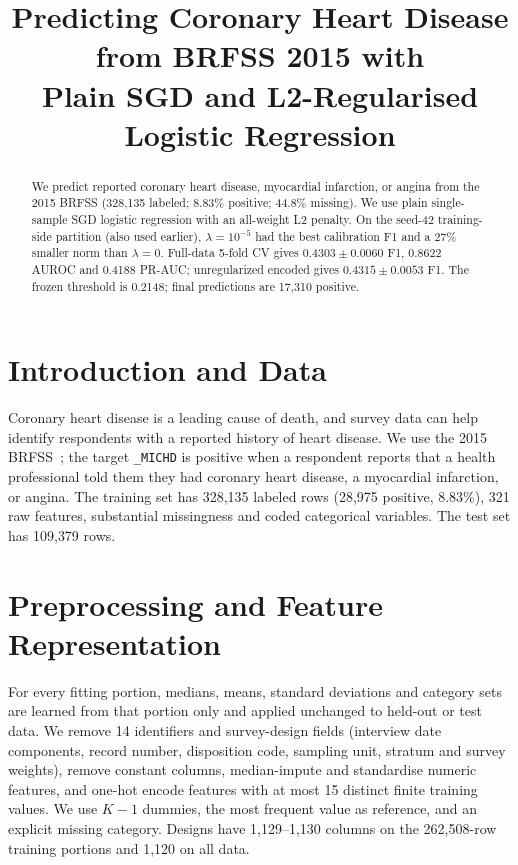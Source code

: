 \documentclass[10pt,conference,compsocconf]{IEEEtran}
\begin{document}
\title{Predicting Coronary Heart Disease from BRFSS 2015 with\\
Plain SGD and L2-Regularised Logistic Regression}

\author{
}

\maketitle

\begin{abstract}
We predict reported coronary heart disease, myocardial infarction, or angina
from the 2015 BRFSS (328{,}135 labeled; 8.83\% positive; 44.8\% missing). We
use plain single-sample SGD logistic regression with an all-weight L2 penalty.
On the seed-42 training-side partition (also used earlier), $\lambda=10^{-5}$
had the best calibration F1 and a 27\% smaller norm than $\lambda=0$. Full-data
5-fold CV gives $0.4303\pm0.0060$ F1, 0.8622 AUROC and 0.4188 PR-AUC;
unregularized encoded gives $0.4315\pm0.0053$ F1. The frozen threshold is
0.2148; final predictions are 17{,}310 positive.
\end{abstract}

\section{Introduction and Data}
Coronary heart disease is a leading cause of death, and survey data can help
identify respondents with a reported history of heart disease. We use the 2015
BRFSS~\cite{brfss15}; the target
\texttt{\_MICHD} is positive when a respondent reports that a health
professional told them they had coronary heart disease, a myocardial
infarction, or angina. The training set has 328{,}135 labeled rows (28{,}975
positive, 8.83\%), 321 raw features, substantial missingness and coded
categorical variables. The test set has 109{,}379 rows.

\section{Preprocessing and Feature Representation}
For every fitting portion, medians, means, standard deviations and category
sets are learned from that portion only and applied unchanged to held-out or
test data. We remove 14 identifiers and survey-design fields (interview date
components, record number, disposition code, sampling unit, stratum and survey
weights), remove constant columns, median-impute and standardise numeric
features, and one-hot encode features with at most 15 distinct finite training
values. We use $K-1$ dummies, the most frequent value as reference, and an
explicit missing category. Designs have 1{,}129--1{,}130 columns on the
262{,}508-row training portions and 1{,}120 on all data.
\end{document}
